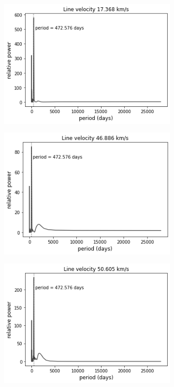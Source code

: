 \begin{figure}
\centering
  \begin{subfigure}{0.33\hsize}
    \includegraphics[width=0.99\hsize]{images/IKTau_blue_17.368_periodogram.png}
  \end{subfigure}%
  \hfill
  \begin{subfigure}{0.33\hsize}
     \includegraphics[width=0.99\hsize]{images/IKTau_red_46.886_periodogram.png}
  \end{subfigure}%
  \hfill
  \begin{subfigure}{0.33\hsize}
    \includegraphics[width=0.99\hsize]{images/IKTau_red_50.605_periodogram.png}

\end{subfigure}
\end{figure}
